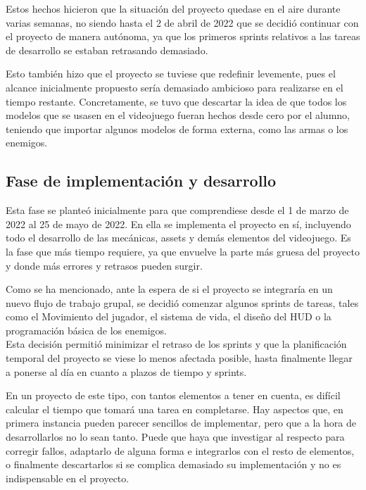 Estos hechos hicieron que la situación del proyecto quedase en el aire durante varias semanas, no siendo hasta el 2 de abril de 2022 que se decidió continuar con el proyecto de manera autónoma, ya que los primeros sprints relativos a las tareas de desarrollo se estaban retrasando demasiado.

Esto también hizo que el proyecto se tuviese que redefinir levemente, pues el alcance inicialmente propuesto sería demasiado ambicioso para realizarse en el tiempo restante. Concretamente, se tuvo que descartar la idea de que todos los modelos que se usasen en el videojuego fueran hechos desde cero por el alumno, teniendo que importar algunos modelos de forma externa, como las armas o los enemigos.

\subsection{Fase de implementación y desarrollo}
Esta fase se planteó inicialmente para que comprendiese desde el 1 de marzo de 2022 al 25 de mayo de 2022. En ella se implementa el proyecto en sí, incluyendo todo el desarrollo de las mecánicas, assets y demás elementos del videojuego. Es la fase que más tiempo requiere, ya que envuelve la parte más gruesa del proyecto y donde más errores y retrasos pueden surgir.

Como se ha mencionado, ante la espera de si el proyecto se integraría en un nuevo flujo de trabajo grupal, se decidió comenzar algunos sprints de tareas, tales como el Movimiento del jugador, el sistema de vida, el diseño del HUD o la programación básica de los enemigos.\\
Esta decisión permitió minimizar el retraso de los sprints y que la planificación temporal del proyecto se viese lo menos afectada posible, hasta finalmente llegar a ponerse al día en cuanto a plazos de tiempo y sprints.

En un proyecto de este tipo, con tantos elementos a tener en cuenta, es difícil calcular el tiempo que tomará una tarea en completarse. Hay aspectos que, en primera instancia pueden parecer sencillos de implementar, pero que a la hora de desarrollarlos no lo sean tanto. Puede que haya que investigar al respecto para corregir fallos, adaptarlo de alguna forma e integrarlos con el resto de elementos, o finalmente descartarlos si se complica demasiado su implementación y no es indispensable en el proyecto.

